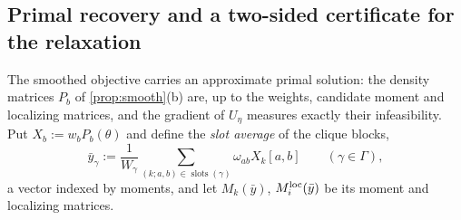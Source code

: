 \documentclass[a4paper,11pt]{article}
\theoremstyle{plain}
\theoremstyle{definition}
\theoremstyle{remark}
\begin{document}
\subsection{Primal recovery and a two-sided certificate for the relaxation}\label{sec:primal}
The smoothed objective carries an approximate primal solution: the density matrices $P_b$ of \cref{prop:smooth}(b) are, up to the weights, candidate moment and localizing matrices, and the gradient of $U_\eta$ measures exactly their infeasibility. Put $X_b:=w_bP_b(\theta)$ and define the \emph{slot average} of the clique blocks,
\begin{equation}\label{eq:ybar}
\bar y_\gamma:=\frac1{W_\gamma}\sum_{(k;a,b)\in\operatorname{slots}(\gamma)}\omega_{ab}X_k[a,b]\qquad(\gamma\in\Gamma),
\end{equation}
a vector indexed by moments, and let $M_k(\bar y)$, $M_i^{\rm loc}(\bar y)$ be its moment and localizing matrices.
\end{document}
